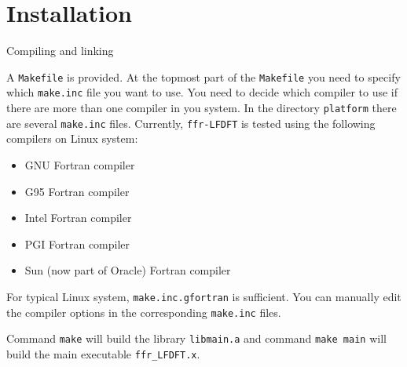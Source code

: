 \section{Installation}

Compiling and linking

A {\tt Makefile} is provided. At the topmost part of the
{\tt Makefile} you need to specify which {\tt make.inc} file you
want to use. You need to decide which compiler to use if there
are more than one compiler in you system.
In the directory {\tt platform} there are several {\tt make.inc} files.
Currently, {\tt ffr-LFDFT} is tested using the following compilers
on Linux system:
\begin{itemize}
\item GNU Fortran compiler
\item G95 Fortran compiler
\item Intel Fortran compiler
\item PGI Fortran compiler
\item Sun (now part of Oracle) Fortran compiler
\end{itemize}
For typical Linux system, {\tt make.inc.gfortran} is sufficient.
You can manually edit the compiler options in the corresponding {\tt make.inc}
files.


Command {\tt make} will build the library {\tt libmain.a} and
command {\tt make main} will build the main executable {\tt ffr\_LFDFT.x}.


